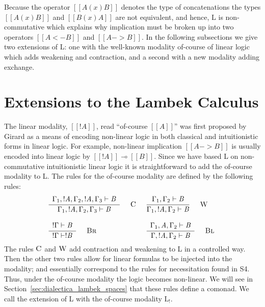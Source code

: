 \documentclass{article}
\newcommand{\LB}{\text{L}_!}
\begin{document}
Because the operator $[[A (x) B]]$ denotes the type of concatenations
the types $[[A (x) B]]$ and $[[B (x) A]]$ are not equivalent, and
hence, \textsf{L} is non-commutative which explains why implication
must be broken up into two operators $[[A <- B]]$ and $[[A -> B]]$.
In the following subsections we give two extensions of L: one with the
well-known modality of-course of linear logic which adds weakening and
contraction, and a second with a new modality adding exchange.

\section{
Extensions to the Lambek Calculus}
\label{subsec:the_lambek_calculus_with_the_weakening_and_contraction_modality}

The linear modality, $[[! A]]$, read ``of-course $[[A]]$'' was first
proposed by Girard \cite{Girard:1987} as a means of encoding
non-linear logic in both classical and intuitionistic forms in linear
logic.  For example, non-linear implication $[[A -> B]]$ is usually
encoded into linear logic by $[[!A]] \multimap [[B]]$. Since we have
based L on non-commutative intuitionistic linear logic it is
straightforward to add the of-course modality to L.  The rules for the
of-course modality are defined by the following rules:
\[
\begin{array}{lll}
  {\displaystyle\frac{\begin{array}{l}   \Gamma_{{\mathrm{1}}} , ! \mathit{A} , \Gamma_{{\mathrm{2}}} , ! \mathit{A} , \Gamma_{{\mathrm{3}}} \vdash \mathit{B}  \\ \end{array}}{ \Gamma_{{\mathrm{1}}} , ! \mathit{A} , \Gamma_{{\mathrm{2}}} , \Gamma_{{\mathrm{3}}} \vdash \mathit{B} }\quad\textsc{ {\textsc{C}}{} }} & {\displaystyle\frac{\begin{array}{l}  \Gamma_{{\mathrm{1}}} , \Gamma_{{\mathrm{2}}} \vdash \mathit{B}  \\ \end{array}}{ \Gamma_{{\mathrm{1}}} , ! \mathit{A} , \Gamma_{{\mathrm{2}}} \vdash \mathit{B} }\quad\textsc{ {\textsc{W}}{} }}\\
  \\
  {\displaystyle\frac{\begin{array}{l}  ! \Gamma \vdash \mathit{B}  \\ \end{array}}{ ! \Gamma \vdash ! \mathit{B} }\quad\textsc{ {\textsc{Br}}{} }} & {\displaystyle\frac{\begin{array}{l}  \Gamma_{{\mathrm{1}}} , \mathit{A} , \Gamma_{{\mathrm{2}}} \vdash \mathit{B}  \\ \end{array}}{ \Gamma , ! \mathit{A} , \Gamma_{{\mathrm{2}}} \vdash \mathit{B} }\quad\textsc{ {\textsc{Bl}}{} }}
\end{array}
\]
The rules $\textsc{C}$ and $\textsc{W}$ add contraction and
weakening to L in a controlled way.  Then the other two rules allow
for linear formulas to be injected into the modality; and essentially
correspond to the rules for necessitation found in S4\cite{?}.  Thus,
under the of-course modality the logic becomes non-linear. We will see
in Section~\ref{sec:dialectica_lambek_spaces} that these rules define
a comonad.  We call the extension of L with the of-course modality
$\LB$.
\end{document}
